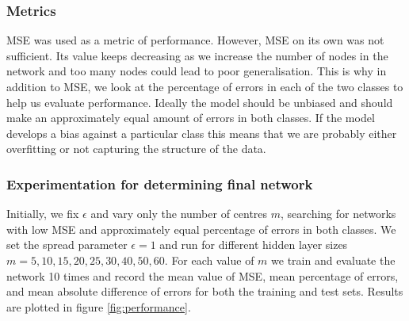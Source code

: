 \documentclass[a4paper, 11pt]{article}
\begin{document}
\subsubsection{Metrics}
MSE was used as a metric of performance. However, MSE on its own was not sufficient. Its value keeps decreasing as we increase the number of nodes in the network and too many nodes could lead to poor generalisation. This is why in addition to MSE, we look at the percentage of errors in each of the two classes to help us evaluate performance. Ideally the model should be unbiased and should make an approximately equal amount of errors in both classes. If the model develops a bias against a particular class this means that we are probably either overfitting or not capturing the structure of the data.



\subsubsection{Experimentation for determining final network}
Initially, we fix $\epsilon$ and vary only the number of centres $m$, searching for networks with low MSE and approximately equal percentage of errors in both classes. We set the spread parameter $\epsilon = 1$ and run for different hidden layer sizes $m = 5, 10, 15, 20, 25, 30, 40, 50, 60$. For each value of $m$ we train and evaluate the network 10 times and record the mean value of MSE, mean percentage of errors, and mean absolute difference of errors for both the training and test sets. Results are plotted in figure \ref{fig:performance}.
\end{document}

